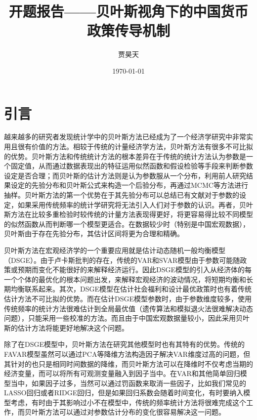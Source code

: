 \documentclass[12pt]{article}
\author{贾昊天}
\title{开题报告——贝叶斯视角下的中国货币政策传导机制}
\date{\today}
\begin{document}
\maketitle
\section{引言}
越来越多的研究者发现统计学中的贝叶斯方法已经成为了一个经济学研究中非常实用且很有价值的方法。相较于传统的计量经济学方法，贝叶斯方法有很多不可比拟的优势。贝叶斯方法和传统统计方法的根本差异在于传统的统计方法认为参数是一个固定值，从而通过数据表现出的特征运用似然函数和假设检验等手段来判断参数设定是否合理；而贝叶斯的估计方法则是认为参数服从一个分布，利用前人研究结果设定的先验分布和贝叶斯公式来构造一个后验分布，再通过MCMC等方法进行抽样。贝叶斯方法的第一个优势在于其先验分布可以总结已有文献对于参数的设定，如果采用传统频率的统计学研究将无法引入人们对于参数的认识。再者，贝叶斯方法在比较多重检验时较传统的计量方法表现得更好，将更容易得比较不同模型的似然函数从而判断哪一个模型更适合。在数据较少时（特别是中国宏观数据），贝叶斯由于存在先验分布，其估计区间将更为合理和精确。

贝叶斯方法在宏观经济学的一个重要应用就是估计动态随机一般均衡模型（DSGE）。由于卢卡斯批判的存在，传统的VAR和SVAR模型由于参数可能随政策或预期而变化不能很好的来解释经济运行。因此DSGE模型的引入从经济体的每一个个体的最优化的根本问题出发，来解释宏观经济的波动情况，将短期均衡和长期均衡联系起来。其次，DSGE模型在估计社会福利和设计最优政策时也有着传统估计方法不可比拟的优势。而在估计DSGE模型参数时，由于参数维度较多，使用传统频率的统计方法很难估计到全局最优值（遗传算法和模拟退火法很难解决动态问题），只能采用一些校准的方法。而且由于中国宏观数据量较小，因此采用贝叶斯的估计方法将能更好地解决这个问题。

除了在DSGE模型中，贝叶斯方法在研究其他模型时也有其特有的优势。传统的FAVAR模型虽然可以通过PCA等降维方法构造因子解决VAR维度过高的问题，但其针对的也只是相同时间数据的降维，而贝叶斯方法可以在降维时不仅考虑当期的经济变量，而可以将所有可观测变量融入到因子当中。在VAR和其他简单回归模型当中，如果因子过多，当然可以通过罚函数来取消一些因子，比如我们常见的LASSO回归或者RIDGE回归，但是如果回归系数会随着时间变化，有时要纳入模型考虑，有时由于其影响过小不在模型中，传统的频率统计方法将很难完成这个工作，而贝叶斯方法可以通过对参数估计分布的变化很容易解决这一问题。
\end{document}
